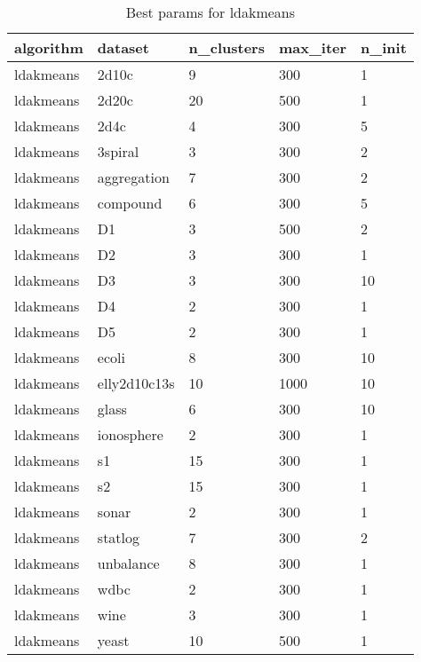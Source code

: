 \begin{table}[H]
\centering
\caption{Best params for ldakmeans}
\label{S31_Table}
\begin{tabular}{|l|l|l|l|l|}
\hline
algorithm & dataset & n\_clusters & max\_iter & n\_init \\
\hline
ldakmeans & 2d10c & 9 & 300 & 1 \\
\hline
ldakmeans & 2d20c & 20 & 500 & 1 \\
\hline
ldakmeans & 2d4c & 4 & 300 & 5 \\
\hline
ldakmeans & 3spiral & 3 & 300 & 2 \\
\hline
ldakmeans & aggregation & 7 & 300 & 2 \\
\hline
ldakmeans & compound & 6 & 300 & 5 \\
\hline
ldakmeans & D1 & 3 & 500 & 2 \\
\hline
ldakmeans & D2 & 3 & 300 & 1 \\
\hline
ldakmeans & D3 & 3 & 300 & 10 \\
\hline
ldakmeans & D4 & 2 & 300 & 1 \\
\hline
ldakmeans & D5 & 2 & 300 & 1 \\
\hline
ldakmeans & ecoli & 8 & 300 & 10 \\
\hline
ldakmeans & elly2d10c13s & 10 & 1000 & 10 \\
\hline
ldakmeans & glass & 6 & 300 & 10 \\
\hline
ldakmeans & ionosphere & 2 & 300 & 1 \\
\hline
ldakmeans & s1 & 15 & 300 & 1 \\
\hline
ldakmeans & s2 & 15 & 300 & 1 \\
\hline
ldakmeans & sonar & 2 & 300 & 1 \\
\hline
ldakmeans & statlog & 7 & 300 & 2 \\
\hline
ldakmeans & unbalance & 8 & 300 & 1 \\
\hline
ldakmeans & wdbc & 2 & 300 & 1 \\
\hline
ldakmeans & wine & 3 & 300 & 1 \\
\hline
ldakmeans & yeast & 10 & 500 & 1 \\
\hline
\end{tabular}
\end{table}

\clearpage

